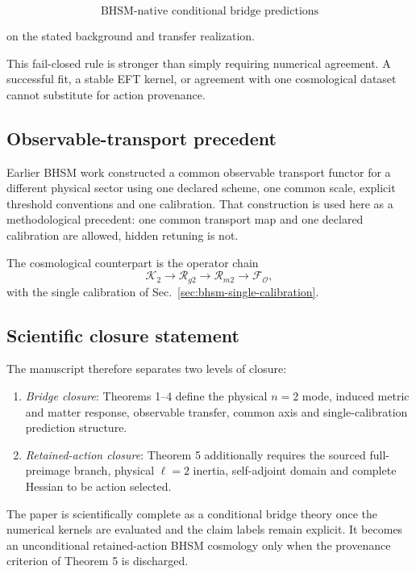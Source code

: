 \begin{equation}
\boxed{
\text{BHSM-native conditional bridge predictions}
}
\end{equation}

on the stated background and transfer realization.

This fail-closed rule is stronger than simply requiring numerical agreement.
A successful fit, a stable EFT kernel, or agreement with one cosmological
dataset cannot substitute for action provenance.

\subsection{Observable-transport precedent}

Earlier BHSM work constructed a common observable transport functor for a
different physical sector using one declared scheme, one common scale,
explicit threshold conventions and one calibration.  That construction is
used here as a methodological precedent: one common transport map and one
declared calibration are allowed, hidden retuning is not.

The cosmological counterpart is the operator chain
\begin{equation}
\mathcal K_2
\longrightarrow
\mathcal R_{g2}
\longrightarrow
\mathcal R_{m2}
\longrightarrow
\mathcal F_{\mathcal O},
\end{equation}
with the single calibration of Sec.~\ref{sec:bhsm-single-calibration}.

\subsection{Scientific closure statement}

The manuscript therefore separates two levels of closure:

\begin{enumerate}
\item \emph{Bridge closure}: Theorems 1--4 define the physical $n=2$ mode,
      induced metric and matter response, observable transfer, common axis
      and single-calibration prediction structure.
\item \emph{Retained-action closure}: Theorem 5 additionally requires the
      sourced full-preimage branch, physical $\ell=2$ inertia, self-adjoint
      domain and complete Hessian to be action selected.
\end{enumerate}

The paper is scientifically complete as a conditional bridge theory once
the numerical kernels are evaluated and the claim labels remain explicit.
It becomes an unconditional retained-action BHSM cosmology only when the
provenance criterion of Theorem 5 is discharged.
